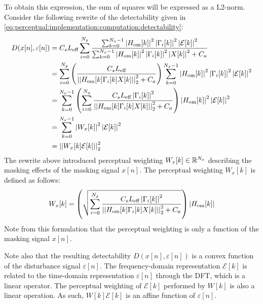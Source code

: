 To obtain this expression, the sum of squares will be expressed as a L2-norm.
Consider the following rewrite of the detectability given in \autoref{eq:perceptual:implementation:computation:detectability}: 
\begin{align*}
    D(x[n],\varepsilon[n]) &= C_s L_\text{eff}\sum_{i=0}^{N_g}
                        \frac{\sum_{k=0}^{N_x-1}\left|H_\text{om}[k]\right|^2\left|
                            \Gamma_i[k]\right|^2\left|\mathcal{E}[k]\right|^2}
                        {\sum_{k=0}^{N_x-1}\left|H_\text{om}[k]\right|^2\left|
                            \Gamma_i[k]\right|^2\left|X[k]\right|^2 + C_a} \\
                           &= \sum_{i=0}^{N_g}
                           \left(\frac{C_s L_\text{eff}}{\norm[2][2]{H_\text{om}[k]\Gamma_i[k]X[k]} + C_a}\right)
                        \sum_{k=0}^{N_x-1}\left|H_\text{om}[k]\right|^2\left|
                        \Gamma_i[k]\right|^2\left|\mathcal{E}[k]\right|^2 \\
                           &= \sum_{k=0}^{N_x-1}\left(\sum_{i=0}^{N_g}\frac{C_s L_\text{eff}\left|\Gamma_i[k]\right|^2}{\norm[2][2]{H_\text{om}[k]\Gamma_i[k]X[k]} + C_a}\right)
                        \left|H_\text{om}[k]\right|^2\left|\mathcal{E}[k]\right|^2 \\
                           &= \sum_{k=0}^{N_x-1}\left|W_x[k]\right|^2\left|\mathcal{E}[k]\right|^2 \\
                           &= \norm[2][2]{W_x[k]\mathcal{E}[k]} 
\end{align*}
The rewrite above introduced perceptual weighting $W_x[k]\in\mathbb{R}^{N_x}$ describing the masking effects of the masking signal $x[n]$. 
The perceptual weighting $W_x[k]$ is defined as follows: 
\begin{equation}
    W_x[k] = \left(\sqrt{\sum_{i=0}^{N_g}\frac{C_s L_\text{eff}\left|\Gamma_i[k]\right|^2}{\norm[2][2]{H_\text{om}[k]\Gamma_i[k]X[k]} + C_a}}\right)
                        \left|H_\text{om}[k]\right|
\end{equation}
Note from this formulation that the perceptual weighting is only a function of the masking signal $x[n]$.

Note also that the resulting detectability $D(x[n],\varepsilon[n])$ is a convex function of the disturbance signal $\varepsilon[n]$. 
The frequency-domain representation $\mathcal{E}[k]$ is related to the time-domain representation $\varepsilon[n]$ through the DFT, which is a linear operator.
The perceptual weighting of $\mathcal{E}[k]$ performed by $W[k]$ is also a linear operation.
As such, $W[k]\mathcal{E}[k]$ is an affine function of $\varepsilon[n]$.
